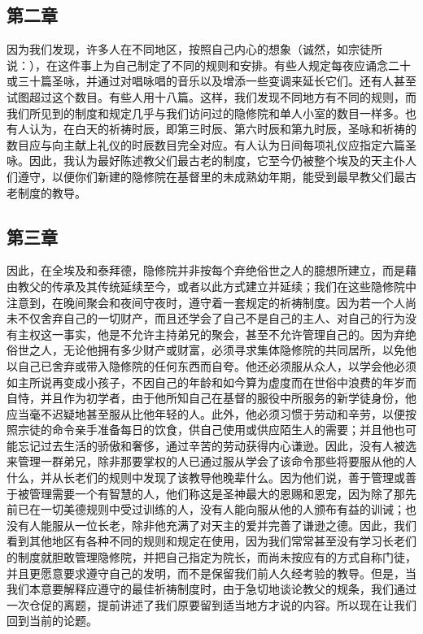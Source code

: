 \subsection{第二章}

\par

因为我们发现，许多人在不同地区，按照自己内心的想象（诚然，如宗徒所说：），在这件事上为自己制定了不同的规则和安排。有些人规定每夜应诵念二十或三十篇圣咏，并通过对唱咏唱的音乐以及增添一些变调来延长它们。还有人甚至试图超过这个数目。有些人用十八篇。这样，我们发现不同地方有不同的规则，而我们所见到的制度和规定几乎与我们访问过的隐修院和单人小室的数目一样多。也有人认为，在白天的祈祷时辰，即第三时辰、第六时辰和第九时辰，圣咏和祈祷的数目应与向主献上礼仪的时辰数目完全对应。有人认为日间每项礼仪应指定六篇圣咏。因此，我认为最好陈述教父们最古老的制度，它至今仍被整个埃及的天主仆人们遵守，以便你们新建的隐修院在基督里的未成熟幼年期，能受到最早教父们最古老制度的教导。\par


\subsection{第三章}

\par

因此，在全埃及和泰拜德，隐修院并非按每个弃绝俗世之人的臆想所建立，而是藉由教父的传承及其传统延续至今，或者以此方式建立并延续；我们在这些隐修院中注意到，在晚间聚会和夜间守夜时，遵守着一套规定的祈祷制度。因为若一个人尚未不仅舍弃自己的一切财产，而且还学会了自己不是自己的主人、对自己的行为没有主权这一事实，他是不允许主持弟兄的聚会，甚至不允许管理自己的。因为弃绝俗世之人，无论他拥有多少财产或财富，必须寻求集体隐修院的共同居所，以免他以自己已舍弃或带入隐修院的任何东西而自夸。他还必须服从众人，以学会他必须如主所说再变成小孩子，不因自己的年龄和如今算为虚度而在世俗中浪费的年岁而自恃，并且作为初学者，由于他所知自己在基督的服役中所服务的新学徒身份，他应当毫不迟疑地甚至服从比他年轻的人。此外，他必须习惯于劳动和辛劳，以便按照宗徒的命令亲手准备每日的饮食，供自己使用或供应陌生人的需要；并且他也可能忘记过去生活的骄傲和奢侈，通过辛苦的劳动获得内心谦逊。因此，没有人被选来管理一群弟兄，除非那要掌权的人已通过服从学会了该命令那些将要服从他的人什么，并从长老们的规则中发现了该教导他晚辈什么。因为他们说，善于管理或善于被管理需要一个有智慧的人，他们称这是圣神最大的恩赐和恩宠，因为除了那先前已在一切美德规则中受过训练的人，没有人能向服从他的人颁布有益的训诫；也没有人能服从一位长老，除非他充满了对天主的爱并完善了谦逊之德。因此，我们看到其他地区有各种不同的规则和规定在使用，因为我们常常甚至没有学习长老们的制度就胆敢管理隐修院，并把自己指定为院长，而尚未按应有的方式自称门徒，并且更愿意要求遵守自己的发明，而不是保留我们前人久经考验的教导。但是，当我们本意要解释应遵守的最佳祈祷制度时，由于急切地谈论教父的规条，我们通过一次仓促的离题，提前讲述了我们原要留到适当地方才说的内容。所以现在让我们回到当前的论题。\par

